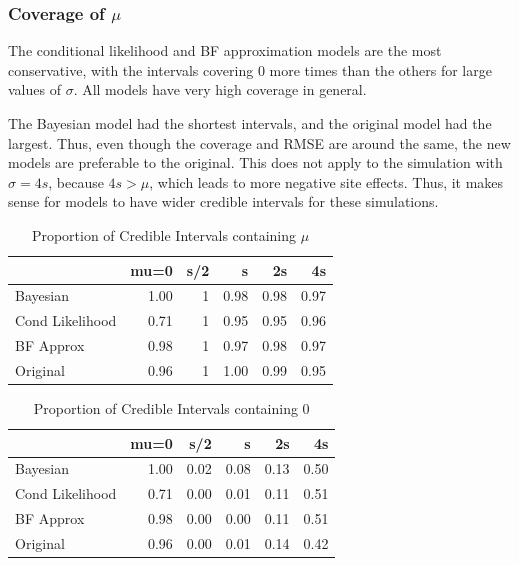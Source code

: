 \documentclass[AMA,STIX1COL]{WileyNJD-v2}\usepackage[]{graphicx}\usepackage[]{color}
\newenvironment{knitrout}{}{} %
\begin{document}
\subsubsection{Coverage of $\mu$}

The conditional likelihood and BF approximation models are the most conservative, with the intervals covering 0 more times than the  others for large values of $\sigma$. All models have very high coverage in general.

The Bayesian model had the shortest intervals, and the original model had the largest. Thus, even though the coverage and RMSE are around the same, the new models are preferable to the original. This does not apply to the simulation with $\sigma=4s$, because $4s>\mu$, which leads to more negative site effects. Thus, it makes sense for models to have wider credible intervals for these simulations. 


\begin{knitrout}
\color{fgcolor}\begin{table}

\caption{\label{tab:unnamed-chunk-27}Proportion of Credible Intervals containing $\mu$}
\centering
\begin{tabular}[t]{l|r|r|r|r|r}
\hline
  & mu=0 & s/2 & s & 2s & 4s\\
\hline
Bayesian & 1.00 & 1 & 0.98 & 0.98 & 0.97\\
\hline
Cond Likelihood & 0.71 & 1 & 0.95 & 0.95 & 0.96\\
\hline
BF Approx & 0.98 & 1 & 0.97 & 0.98 & 0.97\\
\hline
Original & 0.96 & 1 & 1.00 & 0.99 & 0.95\\
\hline
\end{tabular}
\end{table}


\end{knitrout}

\begin{knitrout}
\color{fgcolor}\begin{table}

\caption{\label{tab:unnamed-chunk-28}Proportion of Credible Intervals containing 0}
\centering
\begin{tabular}[t]{l|r|r|r|r|r}
\hline
  & mu=0 & s/2 & s & 2s & 4s\\
\hline
Bayesian & 1.00 & 0.02 & 0.08 & 0.13 & 0.50\\
\hline
Cond Likelihood & 0.71 & 0.00 & 0.01 & 0.11 & 0.51\\
\hline
BF Approx & 0.98 & 0.00 & 0.00 & 0.11 & 0.51\\
\hline
Original & 0.96 & 0.00 & 0.01 & 0.14 & 0.42\\
\hline
\end{tabular}
\end{table}


\end{knitrout}
\end{document}
